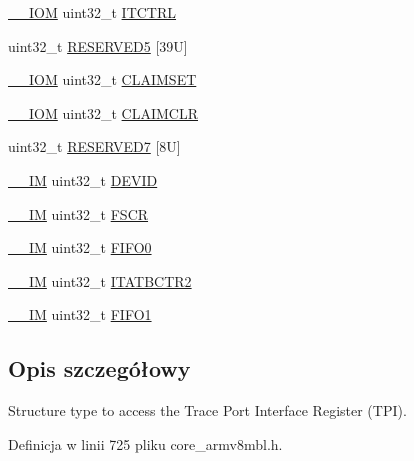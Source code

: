 \begin{DoxyCompactItemize}
\hyperlink{core__sc300_8h_ab6caba5853a60a17e8e04499b52bf691}{\+\_\+\+\_\+\+I\+OM} uint32\+\_\+t \hyperlink{struct_t_p_i___type_aaa4c823c10f115f7517c82ef86a5a68d}{I\+T\+C\+T\+RL}
\item 
uint32\+\_\+t \hyperlink{struct_t_p_i___type_a9c1ac143e09b64b1f6eb92ecd65d60d0}{R\+E\+S\+E\+R\+V\+E\+D5} \mbox{[}39\+U\mbox{]}
\item 
\hyperlink{core__sc300_8h_ab6caba5853a60a17e8e04499b52bf691}{\+\_\+\+\_\+\+I\+OM} uint32\+\_\+t \hyperlink{struct_t_p_i___type_af8b7d15fa5252b733dd4b11fa1b5730a}{C\+L\+A\+I\+M\+S\+ET}
\item 
\hyperlink{core__sc300_8h_ab6caba5853a60a17e8e04499b52bf691}{\+\_\+\+\_\+\+I\+OM} uint32\+\_\+t \hyperlink{struct_t_p_i___type_a0e10e292cb019a832b03ddd055b2f6ac}{C\+L\+A\+I\+M\+C\+LR}
\item 
uint32\+\_\+t \hyperlink{struct_t_p_i___type_a33bb14730a444fdeeb91ea9cb7218e62}{R\+E\+S\+E\+R\+V\+E\+D7} \mbox{[}8\+U\mbox{]}
\item 
\hyperlink{core__sc300_8h_a4cc1649793116d7c2d8afce7a4ffce43}{\+\_\+\+\_\+\+IM} uint32\+\_\+t \hyperlink{struct_t_p_i___type_abc0ecda8a5446bc754080276bad77514}{D\+E\+V\+ID}
\item 
\hyperlink{core__sc300_8h_a4cc1649793116d7c2d8afce7a4ffce43}{\+\_\+\+\_\+\+IM} uint32\+\_\+t \hyperlink{struct_t_p_i___type_ad6901bfd8a0089ca7e8a20475cf494a8}{F\+S\+CR}
\item 
\hyperlink{core__sc300_8h_a4cc1649793116d7c2d8afce7a4ffce43}{\+\_\+\+\_\+\+IM} uint32\+\_\+t \hyperlink{struct_t_p_i___type_aa4d7b5cf39dff9f53bf7f69bc287a814}{F\+I\+F\+O0}
\item 
\hyperlink{core__sc300_8h_a4cc1649793116d7c2d8afce7a4ffce43}{\+\_\+\+\_\+\+IM} uint32\+\_\+t \hyperlink{struct_t_p_i___type_ab358319b969d3fed0f89bbe33e9f1652}{I\+T\+A\+T\+B\+C\+T\+R2}
\item 
\hyperlink{core__sc300_8h_a4cc1649793116d7c2d8afce7a4ffce43}{\+\_\+\+\_\+\+IM} uint32\+\_\+t \hyperlink{struct_t_p_i___type_a061372fcd72f1eea871e2d9c1be849bc}{F\+I\+F\+O1}
\end{DoxyCompactItemize}


\subsection{Opis szczegółowy}
Structure type to access the Trace Port Interface Register (T\+PI). 

Definicja w linii 725 pliku core\+\_\+armv8mbl.\+h.



